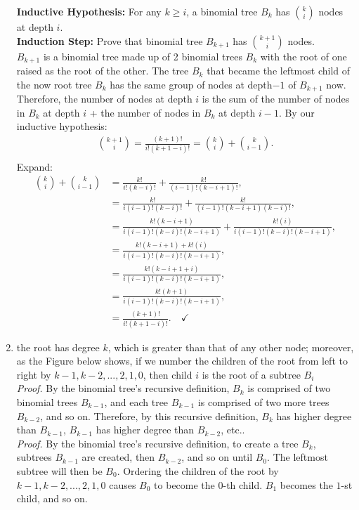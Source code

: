 \documentclass[11pt]{article}
\begin{document}
\begin{enumerate}
    \textbf{Inductive Hypothesis:} For any $k \geq i$, a binomial tree $B_k$ has ${k \choose i}$ nodes at depth $i$.\\
    \textbf{Induction Step:} Prove that binomial tree $B_{k+1}$ has ${k+1 \choose i}$ nodes.\\
    $B_{k+1}$ is a binomial tree made up of 2 binomial trees $B_k$ with the root of one raised as the root of the other. The tree $B_k$ that became the leftmost child of the now root tree $B_k$ has the same group of nodes at depth$-1$ of $B_{k+1}$ now. Therefore, the number of nodes at depth $i$ is the sum of the number of nodes in $B_k$ at depth $i$ + the number of nodes in $B_k$ at depth $i-1$. By our inductive hypothesis:
    \begin{align*}
        {k + 1 \choose i} = \frac{(k+1)!}{i!(k + 1 - i)!} = {k \choose i} + {k \choose i - 1}.\\
    \end{align*}
    Expand:
    \begin{align*}
        {k \choose i} + {k \choose i - 1} & = \frac{k!}{i!(k - i)!} + \frac{k!}{(i - 1)!(k - i + 1)!},\\
        & = \frac{k!}{i(i - 1)!(k - i)!} + \frac{k!}{(i - 1)!(k - i + 1)(k - i)!},\\
        & = \frac{k!(k - i + 1)}{i(i - 1)!(k - i)!(k - i + 1)} + \frac{k!(i)}{i(i - 1)!(k - i)!(k - i + 1)},\\
        & = \frac{k!(k - i + 1) + k!(i)}{i(i - 1)!(k - i)!(k - i + 1)},\\
        & = \frac{k!(k - i + 1 + i)}{i(i - 1)!(k - i)!(k - i + 1)},\\
        & = \frac{k!(k + 1)}{i(i - 1)!(k - i)!(k - i + 1)},\\
        & = \frac{(k+1)!}{i!(k + 1 - i)!}. \quad \checkmark
    \end{align*}
    \item the root has degree $k$, which is greater than that of any other node; moreover, as the Figure below shows, if we number the children of the root from left to right by $k-1, k-2, . . . , 2, 1, 0$, then child $i$ is the root of a subtree $B_i$\\
    \textit{Proof.} By the binomial tree's recursive definition, $B_k$ is comprised of two binomial trees $B_{k-1}$, and each tree $B_{k-1}$ is comprised of two more trees $B_{k-2}$, and so on. Therefore, by this recursive definition, $B_k$ has higher degree than $B_{k-1}$, $B_{k-1}$ has higher degree than $B_{k-2}$, etc..\\
    \textit{Proof.} By the binomial tree's recursive definition, to create a tree $B_k$, subtrees $B_{k-1}$ are created, then $B_{k-2}$, and so on until $B_0$. The leftmost subtree will then be $B_0$. Ordering the children of the root by $k-1, k-2, . . . , 2, 1, 0$ causes $B_0$ to become the $0$-th child. $B_1$ becomes the $1$-st child, and so on.

\end{enumerate}
\end{document}
